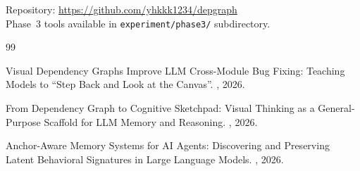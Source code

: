 \documentclass[11pt,a4paper]{article}
\begin{document}
Repository: \url{https://github.com/yhkkk1234/depgraph} \\
Phase~3 tools available in \texttt{experiment/phase3/} subdirectory.


\begin{thebibliography}{99}

Visual Dependency Graphs Improve LLM Cross-Module Bug Fixing: Teaching Models to ``Step Back and Look at the Canvas''.
, 2026.

From Dependency Graph to Cognitive Sketchpad: Visual Thinking as a General-Purpose Scaffold for LLM Memory and Reasoning.
, 2026.

Anchor-Aware Memory Systems for AI Agents: Discovering and Preserving Latent Behavioral Signatures in Large Language Models.
, 2026.

\end{thebibliography}
\end{document}
